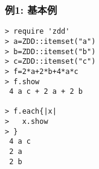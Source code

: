 \subsubsection*{例1: 基本例}



\begin{Verbatim}[baselinestretch=0.7,frame=single]
> require 'zdd'
> a=ZDD::itemset("a")
> b=ZDD::itemset("b")
> c=ZDD::itemset("c")
> f=2*a+2*b+4*a*c
> f.show
 4 a c + 2 a + 2 b

> f.each{|x|
>   x.show
> }
 4 a c
 2 a
 2 b
\end{Verbatim}
